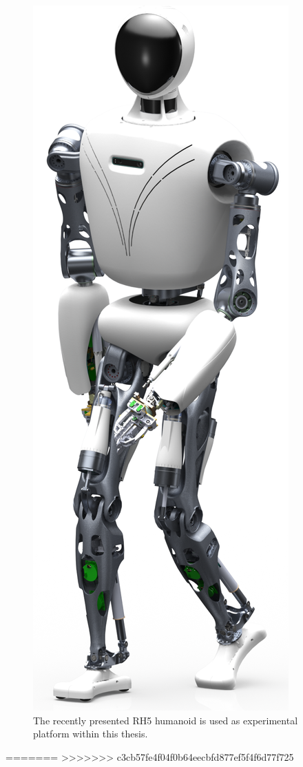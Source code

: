 \begin{figure}[h!]
\centering	
\includegraphics[width=.25\textwidth]{img/rh5_robot.png}
\caption{The recently presented RH5 humanoid is used as experimental platform within this thesis.}
\label{img:rh5_robot}
\end{figure} 













=======
>>>>>>> c3cb57fe4f04f0b64eecbfd877ef5f4f6d77f725
